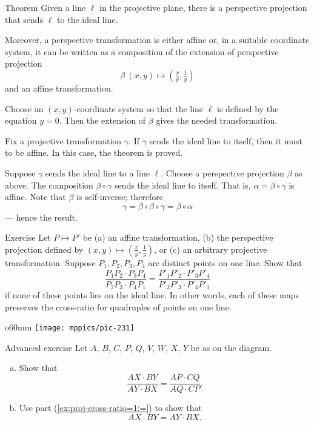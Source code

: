 \begin{thm}{Theorem}\label{thm:moving}
Given a line $\ell$ in the projective plane, there is a perspective projection that sends $\ell$ to the ideal line.

Moreover, a perspective transformation is either affine or, in a suitable coordinate system, it can be written as a composition of the extension of perspective projection 
\[\beta\:(x,y)\mapsto (\tfrac xy,\tfrac 1y)\]
and an affine transformation.
\end{thm}

Choose an $(x,y)$-coordinate system so that the line $\ell$ is defined by the equation $y=0$. 
Then the extension of $\beta$ gives the needed transformation.

Fix a projective transformation $\gamma$.
If $\gamma$ sends the ideal line to itself,
then it must to be affine. 
In this case, the theorem is proved.

Suppose $\gamma$ sends the ideal line to a line $\ell$.
Choose a perspective projection $\beta$ as above.
The composition $\beta\circ\gamma$ sends the ideal line to itself.
That is, $\alpha=\beta\circ\gamma$ is affine.
Note that $\beta$ is self-inverse; therefore 
\[\gamma=\beta\circ\beta\circ\gamma=\beta\circ\alpha\]
--- hence the result.
\qeds

\begin{thm}{Exercise}\label{ex:proj-cross-ratio}
Let $P\mapsto P'$ be (a) an affine transformation, (b) the perspective projection defined by $(x,y)\mapsto (\tfrac xy,\tfrac 1y)$, or (c) an arbitrary projective transformation.
Suppose $P_1,P_2,P_3,P_4$ are distinct points on one line.
Show that 
\[\frac{P_1P_2\cdot P_3P_4}{P_2P_3\cdot P_4P_1}=\frac{P'_1P'_2\cdot P'_3P'_4}{P'_2P'_3\cdot P'_4P'_1}\]
if none of these points lies on the ideal line.
In other words, each of these maps preserves the cross-ratio for quadruples of points on one line.

\end{thm}

{

\begin{wrapfigure}{o}{60mm}
\vskip-0mm
\centering
\texttt{[image: mppics/pic-231]}
\end{wrapfigure}

\begin{thm}{Advanced exercise}\label{ex:proj-cross-ratio=1}
Let $A$, $B$, $C$, $P$, $Q$, $V$, $W$, $X$, $Y$ be as on the diagram.
\begin{enumerate}[(a)]
\item\label{ex:proj-cross-ratio=1:=} Show that 
\[\frac{AX\cdot BY}{AY\cdot BX}=\frac{AP\cdot CQ}{AQ\cdot CP}.\]
\item\label{ex:proj-cross-ratio=1:1} 
Use part (\ref{ex:proj-cross-ratio=1:=}) to show that
\[AX\cdot BY=AY\cdot BX.\]
\end{enumerate}

\end{thm}

}


